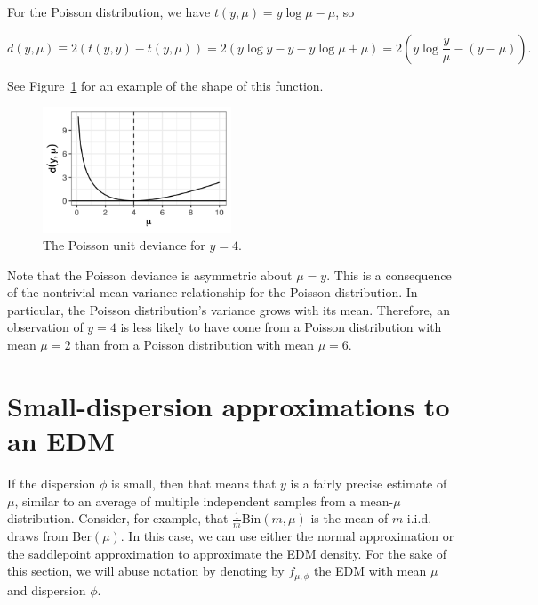 \documentclass[
  11pt,
  letterpaper,
  oneside]{book}
\theoremstyle{definition}
\theoremstyle{plain}
\theoremstyle{plain}
\theoremstyle{plain}
\theoremstyle{remark}
\begin{document}
For the Poisson distribution, we have \(t(y, \mu) = y\log \mu - \mu\),
so

\[
d(y, \mu) \equiv 2(t(y, y) - t(y, \mu)) = 2(y\log y - y - y \log \mu + \mu) = 2\left(y\log \frac{y}{\mu} - (y - \mu)\right).
\]

See Figure~\ref{fig-poisson-unit-deviance} for an example of the shape
of this function.

\begin{figure}

{\centering \includegraphics[width=0.5\textwidth,height=\textheight]{figures/poisson-unit-deviance.png}

}

\caption{\label{fig-poisson-unit-deviance}The Poisson unit deviance for
\(y = 4\).}

\end{figure}

Note that the Poisson deviance is asymmetric about \(\mu = y\). This is
a consequence of the nontrivial mean-variance relationship for the
Poisson distribution. In particular, the Poisson distribution's variance
grows with its mean. Therefore, an observation of \(y = 4\) is less
likely to have come from a Poisson distribution with mean \(\mu = 2\)
than from a Poisson distribution with mean \(\mu = 6\).

\hypertarget{small-dispersion-approximations-to-an-edm}{%
\section{Small-dispersion approximations to an
EDM}\label{small-dispersion-approximations-to-an-edm}}

If the dispersion \(\phi\) is small, then that means that \(y\) is a
fairly precise estimate of \(\mu\), similar to an average of multiple
independent samples from a mean-\(\mu\) distribution. Consider, for
example, that \(\frac{1}{m}\text{Bin}(m, \mu)\) is the mean of \(m\)
i.i.d. draws from \(\text{Ber}(\mu)\). In this case, we can use either
the normal approximation or the saddlepoint approximation to approximate
the EDM density. For the sake of this section, we will abuse notation by
denoting by \(f_{\mu, \phi}\) the EDM with mean \(\mu\) and dispersion
\(\phi\).
\end{document}
